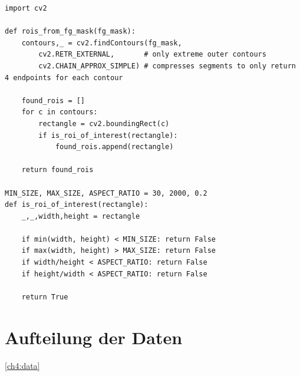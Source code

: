 \begin{code}
\caption{\acp{ROI} in Fordergrundmaske finden }
\label{code:find_rois}
\begin{verbatim}
import cv2

def rois_from_fg_mask(fg_mask):
	contours,_ = cv2.findContours(fg_mask, 
		cv2.RETR_EXTERNAL,       # only extreme outer contours
		cv2.CHAIN_APPROX_SIMPLE) # compresses segments to only return 4 endpoints for each contour

	found_rois = []
	for c in contours:
		rectangle = cv2.boundingRect(c)
		if is_roi_of_interest(rectangle):
			found_rois.append(rectangle)

	return found_rois

MIN_SIZE, MAX_SIZE, ASPECT_RATIO = 30, 2000, 0.2
def is_roi_of_interest(rectangle):
    _,_,width,height = rectangle
    
    if min(width, height) < MIN_SIZE: return False
    if max(width, height) > MAX_SIZE: return False
    if width/height < ASPECT_RATIO: return False
    if height/width < ASPECT_RATIO: return False

    return True
\end{verbatim}
\end{code}

\section{Aufteilung der Daten}
\autoref{ch4:data}


